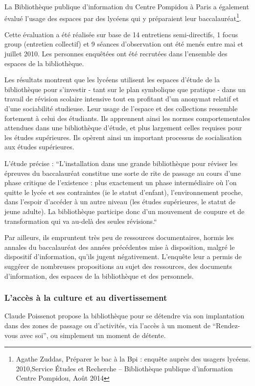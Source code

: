 \documentclass[french,a4paper,12pt]{article}
\begin{document}
\quad La Bibliothèque publique d’information du Centre Pompidou à Paris a également évalué l’usage des espaces par des lycéens qui y préparaient leur baccalauréat\footnote{Agathe Zuddas, Préparer le bac à la Bpi : enquête auprès des usagers lycéens. 2010,Service Études et Recherche – Bibliothèque publique d'information Centre Pompidou, Août 2014}. 

Cette évaluation a été réalisée sur base de 14 entretiens semi-directifs, 1 focus group (entretien collectif) et 9 séances d’observation ont été menés entre mai et juillet 2010. Les personnes enquêtées ont été recrutées dans l’ensemble des espaces de la bibliothèque. 

Les résultats montrent que les lycéens utilisent les espaces d’étude de la bibliothèque pour s’investir - tant sur le plan symbolique que pratique - dans un travail de révision scolaire intensive tout en profitant d’un anonymat relatif et d’une sociabilité studieuse. Leur usage de l’espace et des collections ressemble fortement à celui des étudiants. Ils apprennent ainsi les normes comportementales attendues dans une bibliothèque d’étude, et plus largement celles requises pour les études supérieures. Ils opèrent ainsi un important processus de socialisation aux études supérieures.  

L’étude précise : “L’installation dans une grande bibliothèque pour réviser les épreuves du baccalauréat constitue une sorte de rite de passage au cours d’une phase critique de l’existence : plus exactement un phase intermédiaire où l’on quitte le lycée et ses contraintes (ie le statut d’enfant), l’environnement proche, dans l’espoir d’accéder à un autre niveau (les études supérieures, le statut de jeune adulte). La bibliothèque participe donc d’un mouvement de coupure et de transformation qui va au-delà des seules révisions.“ 

Par ailleurs, ils empruntent très peu de ressources documentaires, hormis les annales du baccalauréat des années précédentes mise à disposition, malgré le dispositif d’information, qu’ils jugent négativement. L'enquête leur a permis de suggérer de nombreuses propositions au sujet des ressources, des documents d’information, des espaces de la bibliothèque et des personnels. 

\subsubsection{L’accès à la culture et au divertissement}

\quad Claude Poissenot  propose la bibliothèque pour se détendre via son implantation dans des zones de passage ou d’activités, via l’accès à un moment de “Rendez-vous avec soi”, ou simplement un moment de détente. 
\end{document}
